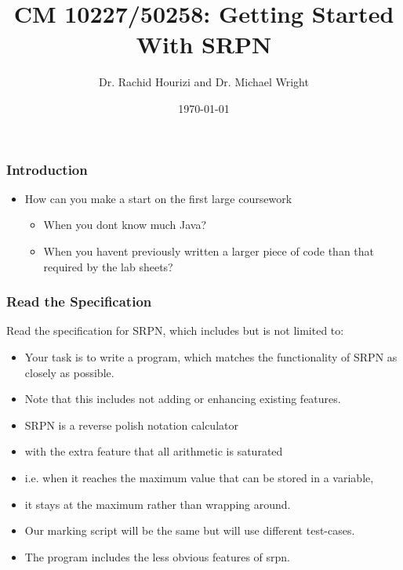 \documentclass{beamer}
\begin{document}

\title{CM 10227/50258: Getting Started With SRPN}
\author{Dr. Rachid Hourizi and Dr. Michael Wright }
\date{\today}
\frame{\titlepage}

\begin{frame}
\frametitle{Introduction}
\begin{itemize}
\item How can you make a start on the first large coursework
\begin{itemize}
\item When you dont know much Java?
\item When you havent previously written a larger piece of code than that required by the lab sheets?
\end{itemize}
\end{itemize}
\end{frame}


\begin{frame}
\frametitle{Read the Specification}
Read the specification for SRPN, which includes but is not limited to:
\begin{itemize}
\item Your task is to write a program, which matches the functionality of SRPN as closely as possible. 
\item Note that this includes not adding or enhancing existing features. 
\item SRPN is a reverse polish notation calculator 
\item with the extra feature that all arithmetic is saturated 
\item i.e. when it reaches the maximum value that can be stored in a variable, 
\item it stays at the maximum rather than wrapping around.
\item Our marking script will be the same but will use different test-cases.
\item The program includes the less obvious features of srpn.
\end{itemize}
\end{frame}
\end{document}

